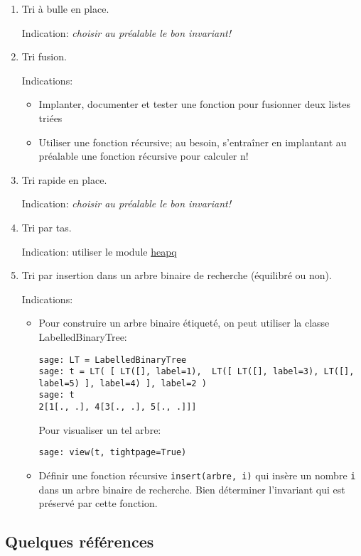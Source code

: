 \begin{enumerate}
\item
  Tri à bulle en place.

  Indication: \emph{choisir au préalable le bon invariant!}
\item
  Tri fusion.

  Indications:

  \begin{itemize}
  \item
    Implanter, documenter et tester une fonction pour fusionner deux
    listes triées
  \item
    Utiliser une fonction récursive; au besoin, s'entraîner en
    implantant au préalable une fonction récursive pour calculer n!
  \end{itemize}
\item
  Tri rapide en place.

  Indication: \emph{choisir au préalable le bon invariant!}
\item
  Tri par tas.

  Indication: utiliser le module
  \href{http://docs.python.org/library/heapq.html}{heapq}
\item
  Tri par insertion dans un arbre binaire de recherche (équilibré ou
  non).

  Indications:

  \begin{itemize}
  \item
    Pour construire un arbre binaire étiqueté, on peut utiliser la
    classe LabelledBinaryTree:

\begin{verbatim}
sage: LT = LabelledBinaryTree
sage: t = LT( [ LT([], label=1),  LT([ LT([], label=3), LT([], label=5) ], label=4) ], label=2 )
sage: t
2[1[., .], 4[3[., .], 5[., .]]]
\end{verbatim}

    Pour visualiser un tel arbre:

\begin{verbatim}
sage: view(t, tightpage=True)
\end{verbatim}
  \item
    Définir une fonction récursive \texttt{insert(arbre, i)} qui insère
    un nombre \texttt{i} dans un arbre binaire de recherche. Bien
    déterminer l'invariant qui est préservé par cette fonction.
  \end{itemize}
\end{enumerate}

\subsection{Quelques références}

